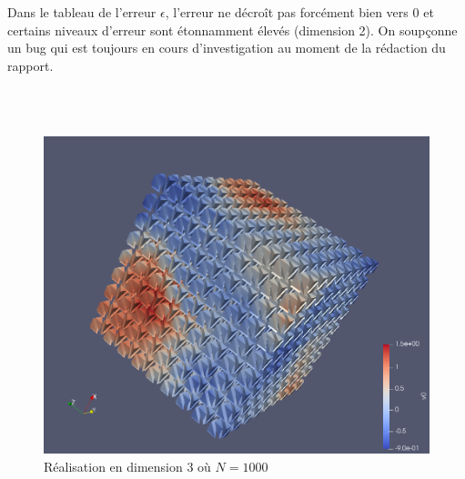 \begin{remark}
  Dans le tableau de l'erreur $\epsilon$, l'erreur ne décroît pas forcément bien vers $0$ et certains niveaux d'erreur
  sont étonnamment élevés (dimension 2). On soupçonne un bug qui est toujours en cours d'investigation au moment de la
  rédaction du rapport.
\end{remark}

\phantom{oyez}\\
\phantom{oyez}\\

\begin{figure}[h]
\centering
\includegraphics[scale=0.4]{images/meshSpectral3D-1000.png}
\caption{Réalisation en dimension 3 où $N = 1000$ }
\label{ReaDim2-961}  

\end{figure}
